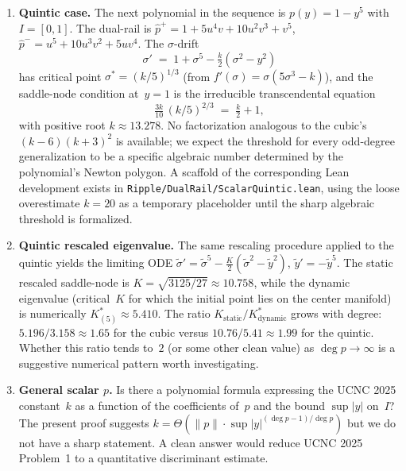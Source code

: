 \documentclass[11pt]{article}
\begin{document}
\begin{enumerate}
\item \textbf{Quintic case.}  The next polynomial in the sequence is
      $p(y) = 1 - y^{5}$ with $I = [0, 1]$.  The dual-rail is
      $\hat{p}^{+} = 1 + 5 u^{4} v + 10 u^{2} v^{3} + v^{5}$,
      $\hat{p}^{-} = u^{5} + 10 u^{3} v^{2} + 5 u v^{4}$.  The
      $\sigma$-drift
      \[
        \sigma' \;=\; 1 + \sigma^{5} - \tfrac{k}{2}(\sigma^{2} - y^{2})
      \]
      has critical point $\sigma^{*} = (k/5)^{1/3}$ (from
      $f'(\sigma) = \sigma(5\sigma^{3} - k)$), and the saddle-node
      condition at~$y = 1$ is the irreducible transcendental equation
      \[
        \tfrac{3k}{10}\,(k/5)^{2/3} \;=\; \tfrac{k}{2} + 1,
      \]
      with positive root $k \approx 13.278$.  No factorization analogous
      to the cubic's $(k-6)(k+3)^{2}$ is available; we expect the
      threshold for every odd-degree generalization to be a specific
      algebraic number determined by the polynomial's Newton polygon.
      A scaffold of the corresponding Lean development exists in
      \verb|Ripple/DualRail/ScalarQuintic.lean|, using the loose
      overestimate $k = 20$ as a temporary placeholder until the sharp
      algebraic threshold is formalized.

\item \textbf{Quintic rescaled eigenvalue.}  The same rescaling procedure
      applied to the quintic yields the limiting ODE
      $\tilde{\sigma}' = \tilde{\sigma}^{5}
      - \tfrac{K}{2}(\tilde{\sigma}^{2} - \tilde{y}^{2})$,
      $\tilde{y}' = -\tilde{y}^{5}$.  The static rescaled saddle-node is
      $K = \sqrt{3125/27} \approx 10.758$, while the dynamic eigenvalue
      (critical~$K$ for which the initial point lies on the center
      manifold) is numerically $K^{*}_{(5)} \approx 5.410$.  The ratio
      $K_{\text{static}}/K^{*}_{\text{dynamic}}$ grows with degree:
      $5.196 / 3.158 \approx 1.65$ for the cubic versus
      $10.76 / 5.41 \approx 1.99$ for the quintic.  Whether this ratio
      tends to~$2$ (or some other clean value) as $\deg p \to \infty$ is
      a suggestive numerical pattern worth investigating.

\item \textbf{General scalar $p$.}  Is there a polynomial formula expressing
      the UCNC 2025 constant~$k$ as a function of the coefficients of~$p$ and
      the bound $\sup |y|$ on~$I$?  The present proof suggests $k = \Theta(\|p\|
      \cdot \sup|y|^{(\deg p - 1)/\deg p})$ but we do not have a sharp
      statement.  A clean answer would reduce UCNC 2025 Problem~1 to a
      quantitative discriminant estimate.


\end{enumerate}
\end{document}
